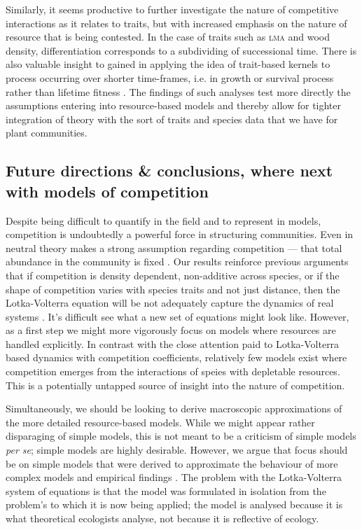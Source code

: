 \documentclass[a4paper,11pt]{article}
\begin{document}
Similarly, it seems productive to further investigate the nature of
competitive interactions as it relates to traits, but with increased
emphasis on the nature of resource that is being contested. In the
case of traits such as \textsc{lma} and wood density, differentiation
corresponds to a subdividing of successional time. There is also
valuable insight to gained in applying the idea of trait-based kernels
to process occurring over shorter time-frames, i.e. in growth or
survival process rather than lifetime fitness
\citep[e.g.][]{Kunstler-2012, Lasky-2015}.  The findings of such
analyses test more directly the assumptions entering into
resource-based models and thereby allow for tighter integration of
theory with the sort of traits and species data that we have for plant
communities.

\subsection{Future directions \& conclusions, where next with models of
competition}

Despite being difficult to quantify in the field and to represent in
models, competition is undoubtedly a powerful force in structuring
communities.
Even in neutral theory makes a
strong assumption regarding competition --- that total abundance in
the community is fixed \citep{Hubbell-2001}.
%
Our results reinforce previous arguments that if competition is
density dependent, non-additive across species, or if the shape of
competition varies with species traits and not just distance, then the
Lotka-Volterra equation will be not adequately capture the dynamics of
real systems \citep{Andrewartha-1953, Neill-1974, Abrams-1975,
  Wangersky-1978,Abrams-1980, Tilman-1987}.  It's difficult see what a
new set of equations might look like.  However, as a first step we
might more vigorously focus on models where resources are handled
explicitly.  In contrast with the close attention
paid to Lotka-Volterra based dynamics with competition coefficients,
relatively few models exist where competition emerges from the
interactions of speies with depletable resources. This is a potentially
untapped source of insight into the nature of competition.

Simultaneously, we should be looking to derive macroscopic
approximations of the more detailed resource-based models.  While we
might appear rather disparaging of simple models, this is not meant
to be a criticism of simple models \textit{per se}; simple models are
highly desirable.  However, we argue that focus should be on simple models
that were derived to approximate the behaviour of more complex models and
empirical findings \citep[e.g.][]{Champagnat-2006}.
The problem with the Lotka-Volterra system of equations is that the
model was formulated in isolation from the problem's to which it is
now being applied; the model is analysed because it is what
theoretical ecologists analyse, not because it is reflective of
ecology.
\end{document}
